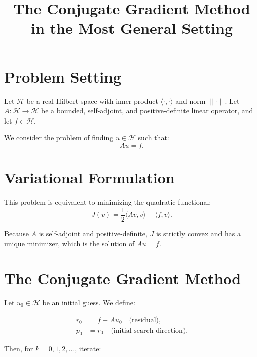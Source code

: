\documentclass[12pt]{article}
\title{The Conjugate Gradient Method in the Most General Setting}
\author{}
\date{}
\begin{document}
\maketitle

\section{Problem Setting}

Let \( \mathcal{H} \) be a real Hilbert space with inner product \( \langle \cdot, \cdot \rangle \) and norm \( \| \cdot \| \). Let \( A : \mathcal{H} \to \mathcal{H} \) be a bounded, self-adjoint, and positive-definite linear operator, and let \( f \in \mathcal{H} \).

We consider the problem of finding \( u \in \mathcal{H} \) such that:
\[
A u = f.
\]

\section{Variational Formulation}

This problem is equivalent to minimizing the quadratic functional:
\[
J(v) = \frac{1}{2} \langle A v, v \rangle - \langle f, v \rangle.
\]

Because \( A \) is self-adjoint and positive-definite, \( J \) is strictly convex and has a unique minimizer, which is the solution of \( A u = f \).

\section{The Conjugate Gradient Method}

Let \( u_0 \in \mathcal{H} \) be an initial guess. We define:

\begin{align*}
r_0 &= f - A u_0 \quad \text{(residual)}, \\
p_0 &= r_0 \quad \text{(initial search direction)}.
\end{align*}

Then, for \( k = 0, 1, 2, \dots \), iterate:
\end{document}
